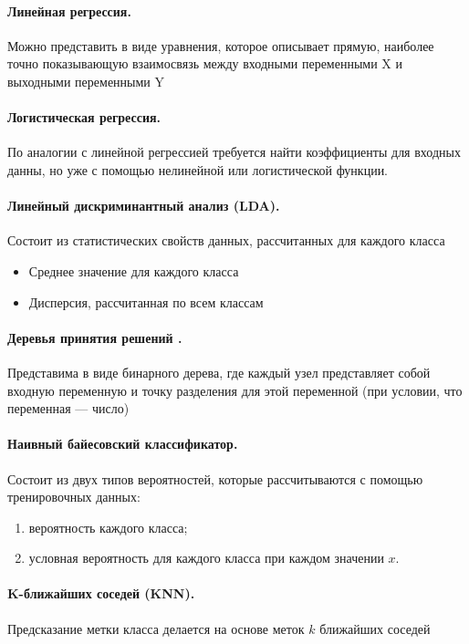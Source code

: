 \documentclass[times,specification,annotation]{itmo-student-thesis}
\begin{document}
	\paragraph{Линейная регрессия.} Можно представить в виде уравнения, которое описывает прямую, наиболее точно показывающую взаимосвязь между входными переменными X и выходными переменными Y
	\paragraph{Логистическая регрессия.} По аналогии с линейной регрессией требуется найти коэффициенты для входных данны, но уже с помощью нелинейной или логистической функции.
	\paragraph{Линейный дискриминантный анализ (LDA).} Состоит из статистических свойств данных, рассчитанных для каждого класса
	\begin{itemize}
		\item Среднее значение для каждого класса
		\item Дисперсия, рассчитанная по всем классам
	\end{itemize}
	\paragraph{Деревья принятия решений \cite{wan2020nbdt}.} Представима в виде бинарного дерева, где каждый узел представляет собой входную переменную и точку разделения для этой переменной (при условии, что переменная — число)
	\paragraph{Наивный байесовский классификатор.} Состоит из двух типов вероятностей, которые рассчитываются с помощью тренировочных данных:
	\begin{enumerate} 
		\item вероятность каждого класса;
		\item условная вероятность для каждого класса при каждом значении $ x $.
	\end{enumerate}
	\paragraph{K-ближайших соседей (KNN).} Предсказание метки класса делается на основе меток $ k $ ближайших соседей
\end{document}
